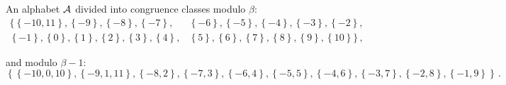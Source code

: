 \begin{exmp}
\label{ex:integerAR}

An alphabet $\mathcal{A}$ divided into congruence classes modulo $\beta$: 
\begin{align*}
\{\left\{-10, 11\right\}, \left\{-9\right\}, \left\{-8\right\}, \left\{-7\right\},& \left\{-6\right\}, \left\{-5\right\}, \left\{-4\right\}, \left\{-3\right\}, \left\{-2\right\},  \\
\left\{-1\right\}, \left\{0\right\}, \left\{1\right\}, \left\{2\right\}, \left\{3\right\}, \left\{4\right\},& \left\{5\right\}, \left\{6\right\}, \left\{7\right\}, \left\{8\right\}, \left\{9\right\}, \left\{10\right\}\} \,,
\end{align*}

and modulo $\beta - 1$: $$ \left\{\left\{-10, 0, 10\right\}, \left\{-9, 1, 11\right\}, \left\{-8, 2\right\}, \left\{-7, 3\right\}, \left\{-6, 4\right\}, \left\{-5, 5\right\}, \left\{-4, 6\right\}, \left\{-3, 7\right\}, \left\{-2, 8\right\}, \left\{-1, 9\right\}\right\} \,.$$

\end{exmp}


